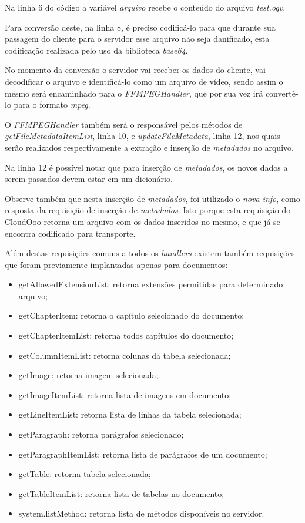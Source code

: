 Na linha 6 do código a variável \textit{arquivo} recebe o conteúdo do arquivo \textit{test.ogv}.

Para conversão deste, na linha 8, é preciso codificá-lo para que durante sua passagem do cliente para o servidor esse arquivo não seja danificado, esta codificação realizada pelo uso da biblioteca \textit{base64}.

No momento da conversão o servidor vai receber os dados do cliente, vai decodificar o arquivo e identificá-lo como um arquivo de vídeo, sendo assim o mesmo será encaminhado para o \textit{FFMPEGHandler}, que por sua vez irá convertê-lo para o formato \textit{mpeg}.

O \textit{FFMPEGHandler} também será o responsável pelos métodos de \textit{getFileMetadataItemList}, linha 10, e \textit{updateFileMetadata}, linha 12, nos quais serão realizados respectivamente a extração e inserção de \textit{metadados} no arquivo.

Na linha 12 é possível notar que para inserção de \textit{metadados}, os novos dados a serem passados devem estar em um dicionário.

Observe também que nesta inserção de \textit{metadados}, foi utilizado o \textit{nova-info}, como resposta da requisição de inserção de \textit{metadados}. Isto porque esta requisição do CloudOoo retorna um arquivo com os dados inseridos no mesmo, e que já se encontra codificado para transporte.

Além destas requisições comuns a todos os \textit{handlers} existem também requisições que foram previamente implantadas apenas para documentos:

\begin{itemize}
    \item{getAllowedExtensionList: retorna extensões permitidas para determinado arquivo;}
    \item{getChapterItem: retorna o capítulo selecionado do documento;}
    \item{getChapterItemList: retorna todos capítulos do documento;}
    \item{getColumnItemList: retorna colunas da tabela selecionada;}
    \item{getImage: retorna imagem selecionada;}
    \item{getImageItemList: retorna lista de imagens em documento;}
    \item{getLineItemList: retorna lista de linhas da tabela selecionada;}
    \item{getParagraph: retorna parágrafos selecionado;}
    \item{getParagraphItemList: retorna lista de parágrafos de um documento;}
    \item{getTable: retorna tabela selecionada;}
    \item{getTableItemList: retorna lista de tabelas no documento;}
    \item{system.listMethod: retorna lista de métodos disponíveis no servidor.}
\end{itemize}

